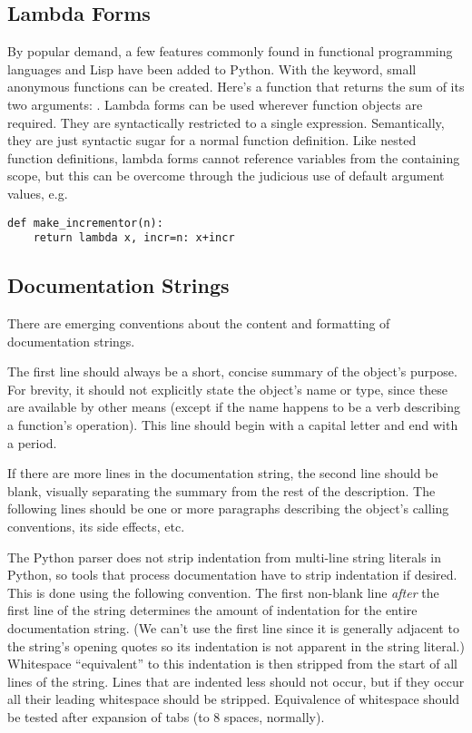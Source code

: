 \documentclass{manual}
\begin{document}
\subsection{Lambda Forms \label{lambda}}

By popular demand, a few features commonly found in functional
programming languages and Lisp have been added to Python.  With the
 keyword, small anonymous functions can be created.
Here's a function that returns the sum of its two arguments:
.  Lambda forms can be used wherever function
objects are required.  They are syntactically restricted to a single
expression.  Semantically, they are just syntactic sugar for a normal
function definition.  Like nested function definitions, lambda forms
cannot reference variables from the containing scope, but this can be
overcome through the judicious use of default argument values, e.g.

\begin{verbatim}
def make_incrementor(n):
    return lambda x, incr=n: x+incr
\end{verbatim}


\subsection{Documentation Strings \label{docstrings}}

There are emerging conventions about the content and formatting of
documentation strings.

The first line should always be a short, concise summary of the
object's purpose.  For brevity, it should not explicitly state the
object's name or type, since these are available by other means
(except if the name happens to be a verb describing a function's
operation).  This line should begin with a capital letter and end with
a period.

If there are more lines in the documentation string, the second line
should be blank, visually separating the summary from the rest of the
description.  The following lines should be one or more paragraphs
describing the object's calling conventions, its side effects, etc.

The Python parser does not strip indentation from multi-line string
literals in Python, so tools that process documentation have to strip
indentation if desired.  This is done using the following convention.
The first non-blank line \emph{after} the first line of the string
determines the amount of indentation for the entire documentation
string.  (We can't use the first line since it is generally adjacent
to the string's opening quotes so its indentation is not apparent in
the string literal.)  Whitespace ``equivalent'' to this indentation is
then stripped from the start of all lines of the string.  Lines that
are indented less should not occur, but if they occur all their
leading whitespace should be stripped.  Equivalence of whitespace
should be tested after expansion of tabs (to 8 spaces, normally).
\end{document}
